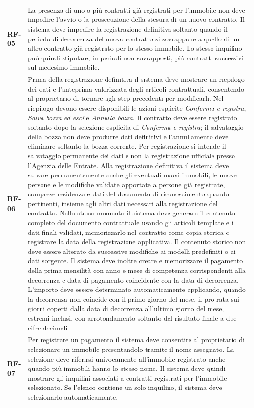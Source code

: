 \documentclass[12pt,a4paper]{article}
\newcommand{\req}[1]{\textbf{#1}}
\begin{document}
\begin{longtable}{>{\raggedright\arraybackslash}p{1.8cm}
                  >{\raggedright\arraybackslash}p{13cm}}
\req{RF-05} &
La presenza di uno o più contratti già registrati per l'immobile non deve impedire l'avvio o
la prosecuzione della stesura di un nuovo contratto. Il sistema deve impedire la registrazione
definitiva soltanto quando il periodo di decorrenza del nuovo contratto si sovrappone a quello
di un altro contratto già registrato per lo stesso immobile. Lo stesso inquilino può quindi
stipulare, in periodi non sovrapposti, più contratti successivi sul medesimo immobile. \\

\req{RF-06} &
Prima della registrazione definitiva il sistema deve mostrare un riepilogo dei dati e
l'anteprima valorizzata degli articoli contrattuali, consentendo al proprietario di tornare agli
step precedenti per modificarli. Nel riepilogo devono essere disponibili le azioni esplicite
\emph{Conferma e registra}, \emph{Salva bozza ed esci} e \emph{Annulla bozza}. Il contratto deve
essere registrato soltanto dopo la selezione esplicita di \emph{Conferma e registra}; il salvataggio
della bozza non deve produrre dati definitivi e l'annullamento deve eliminare soltanto la bozza
corrente.
Per registrazione si intende il salvataggio permanente dei dati e non la registrazione
ufficiale presso l'Agenzia delle Entrate. Alla registrazione definitiva il sistema deve salvare permanentemente anche gli eventuali nuovi
immobili, le nuove persone e le modifiche validate apportate a persone già registrate, comprese
residenza e dati del documento di riconoscimento quando pertinenti, insieme agli altri dati
necessari alla registrazione del contratto. Nello stesso momento il sistema deve generare il
contenuto completo del documento contrattuale usando gli articoli template e i dati finali validati,
memorizzarlo nel contratto come copia storica e registrare la data della registrazione applicativa.
Il contenuto storico non deve essere alterato da successive modifiche ai modelli predefiniti o ai
dati sorgente. Il sistema deve inoltre creare e memorizzare il pagamento
della prima mensilità con anno e mese di competenza corrispondenti alla decorrenza e data di
pagamento coincidente con la data di decorrenza. L'importo deve essere determinato automaticamente
applicando, quando la decorrenza non coincide con il primo giorno del mese, il pro-rata sui giorni
coperti dalla data di decorrenza all'ultimo giorno del mese, estremi inclusi, con arrotondamento
soltanto del risultato finale a due cifre decimali. \\

\req{RF-07} &
Per registrare un pagamento il sistema deve consentire al proprietario di selezionare
un immobile presentandolo tramite il nome assegnato. La selezione deve riferirsi
univocamente all'immobile registrato anche quando più immobili hanno lo stesso nome.
Il sistema deve quindi mostrare gli inquilini associati a contratti registrati per
l'immobile selezionato. Se l'elenco contiene un solo inquilino, il sistema deve
selezionarlo automaticamente. \\


\end{longtable}
\end{document}
